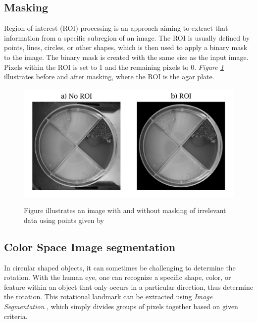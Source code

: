 \subsection{Masking}
\noindent Region-of-interest (ROI) processing is an approach aiming to extract that information from a specific subregion of an image. The ROI is usually defined by points, lines, circles, or other shapes, which is then used to apply a binary mask to the image. The binary mask is created with the same size as the input image. Pixels within the ROI is set to 1 and the remaining pixels to 0. \textit{Figure \ref{fig:masking}} illustrates before and after masking, where the ROI is the agar plate. \\ 

\begin{figure}[htb]
    \centering
    \includegraphics[width=0.7\linewidth]{figures/PDF/ROI.pdf}\\
    \caption{Figure illustrates an image with and without masking of irrelevant data using points given by }
    \label{fig:masking}
\end{figure}

\subsection{Color Space Image segmentation}
In circular shaped objects, it can sometimes be challenging to determine the rotation. With the human eye, one can recognize a specific shape, color, or feature within an object that only occurs in a particular direction, thus determine the rotation. This rotational landmark can be extracted using \textit{Image Segmentation} \cite{Rahmat}, which simply divides groups of pixels together based on given criteria.\\  


